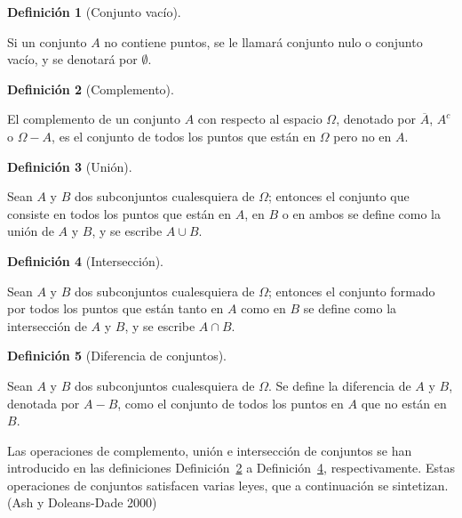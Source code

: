 \documentclass[
  us-letterpaper,
]{scrreprt}
\theoremstyle{plain}
\theoremstyle{definition}
\newtheorem{definition}{Definición}[chapter]
\theoremstyle{definition}
\theoremstyle{plain}
\theoremstyle{remark}
\begin{document}
\begin{definition}[Conjunto
vacío]\protect\hypertarget{def-emptyset}{}\label{def-emptyset}

Si un conjunto \(A\) no contiene puntos, se le llamará conjunto nulo o
conjunto vacío, y se denotará por \(\emptyset\).

\end{definition}

\begin{definition}[Complemento]\protect\hypertarget{def-comp}{}\label{def-comp}

El complemento de un conjunto \(A\) con respecto al espacio \(\Omega\),
denotado por \(\overline{A}\), \(A^c\) o \(\Omega-A\), es el conjunto de
todos los puntos que están en \(\Omega\) pero no en \(A\).

\end{definition}

\begin{definition}[Unión]\protect\hypertarget{def-union}{}\label{def-union}

Sean \(A\) y \(B\) dos subconjuntos cualesquiera de \(\Omega\); entonces
el conjunto que consiste en todos los puntos que están en \(A\), en
\(B\) o en ambos se define como la unión de \(A\) y \(B\), y se escribe
\(A \cup B\).

\end{definition}

\begin{definition}[Intersección]\protect\hypertarget{def-inter}{}\label{def-inter}

Sean \(A\) y \(B\) dos subconjuntos cualesquiera de \(\Omega\); entonces
el conjunto formado por todos los puntos que están tanto en \(A\) como
en \(B\) se define como la intersección de \(A\) y \(B\), y se escribe
\(A \cap B\).

\end{definition}

\begin{definition}[Diferencia de
conjuntos]\protect\hypertarget{def-dfc}{}\label{def-dfc}

Sean \(A\) y \(B\) dos subconjuntos cualesquiera de \(\Omega\). Se
define la diferencia de \(A\) y \(B\), denotada por \(A-B\), como el
conjunto de todos los puntos en \(A\) que no están en \(B\).

\end{definition}

Las operaciones de complemento, unión e intersección de conjuntos se han
introducido en las definiciones Definición~\ref{def-comp} a
Definición~\ref{def-inter}, respectivamente. Estas operaciones de
conjuntos satisfacen varias leyes, que a continuación se sintetizan.
(Ash y Doleans-Dade 2000)
\end{document}
